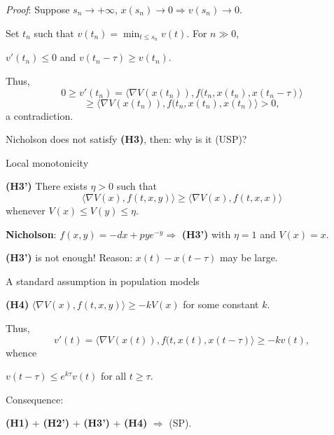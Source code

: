 \documentclass[spanish]{beamer}
\def \le{\leqslant}
\def \ge{\geqslant}
\begin{document}
\begin{frame}{}
\emph{Proof}: Suppose  $s_n\to +\infty$, $x(s_n)\to 0 \Longrightarrow v(s_n)\to 0$. 
\smallskip 

Set $t_n$ such that    $v(t_n) =\min_{t\le s_n} v(t)$. 
For $n\gg 0$, 
\begin{center}
    $v'(t_n)\le 0$ and  $v(t_n-\tau)\ge v(t_n)$.
\end{center}
Thus,
$$0\ge v'(t_n)=\langle \nabla V(x(t_n)),f(t_n,x(t_n),x(t_n-\tau)\rangle
$$
$$\ge \langle \nabla V(x(t_n)),f(t_n,x(t_n),x(t_n)\rangle >0,$$  a contradiction. 
\medskip 
\pause 


Nicholson does not satisfy {\bf (H3)}, then: why is it (USP)?

\end{frame}    
\begin{frame}{Local monotonicity}

{\bf (H3')} There exists $\eta >0$ such that
$$\langle \nabla V(x),f(t,x,y)\rangle \ge \langle \nabla V(x),f(t,x,x)\rangle$$
whenever $V(x)\le V(y)\le \eta$. 

    \bigskip 
{\bf    Nicholson}: $f(x,y)= -dx + pye^{-y} \Longrightarrow$  {\bf (H3')} with $\eta=1$ and $V(x)=x$. 

\bigskip 
\pause 

{\bf (H3')} is not enough! Reason: $x(t)-x(t-\tau)$ may be large.  

\end{frame}

\begin{frame}{A standard assumption in population models}

    {\bf (H4)} 
$\langle \nabla V(x),f(t,x,y)\rangle \ge -k V(x) $ for some constant $k$. 
\medskip{}

Thus, 
$$v'(t)= 
\langle \nabla V(x(t)), f(t,x(t),x(t-\tau)\rangle \ge -kv(t),
$$
whence
\begin{center}
    $v(t-\tau) \le e^{k\tau}v(t)$ for all $t\ge \tau$.
\end{center}
\medskip 

Consequence:  

\begin{center}
        {\bf (H1)} +     {\bf (H2')} +     {\bf (H3')} +     {\bf (H4)} $\Longrightarrow$ (SP). 
\end{center}    
 
 
 

\end{frame}
\end{document}
